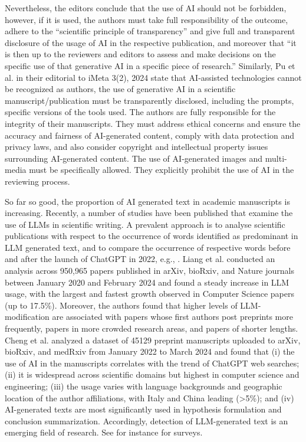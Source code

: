 Nevertheless, the editors conclude that the use of AI should not be forbidden, however, if it is used, the authors must take full responsibility of the outcome, adhere to the “scientific principle of transparency” and give full and transparent disclosure of the usage of AI in the respective publication, and moreover that “it is then up to the reviewers and editors to assess and make decisions on the specific use of that generative AI in a specific piece of research.”
Similarly, Pu et al. \cite{pu2024chatgpt} in their editorial to iMeta 3(2), 2024 state that AI‐assisted technologies cannot be recognized as authors, the use of generative AI in a scientific manuscript/publication must be transparently disclosed, including the prompts, specific versions of the tools used. The authors are fully responsible for the integrity of their manuscripts. They must address ethical concerns and ensure the accuracy and fairness of AI-generated content, comply with data protection and privacy laws, and also consider copyright and intellectual property issues surrounding AI‐generated content. The use of AI‐generated images and multi-media must be specifically allowed. They explicitly prohibit the use of AI in the reviewing process.

So far so good, the proportion of AI generated text in academic manuscripts is increasing. Recently, a number of studies have been published that examine the use of LLMs in scientific writing. A prevalent approach is to analyse scientific publications with respect to the occurrence of words identified as predominant in LLM generated text, and to compare the occurrence of respective words before and after the launch of ChatGPT in 2022, e.g.,  \cite{gray2024chatgptcontaminationestimatingprevalence, kobak2024delving}.  Liang et al. \cite{liang2024mapping} conducted an analysis across 950,965 papers published in arXiv, bioRxiv, and Nature journals between January 2020 and February 2024 and found a steady increase in LLM usage, with the largest and fastest growth observed in Computer Science papers (up to 17.5\%). Moreover, the authors found that higher levels of LLM-modification are associated with papers whose first authors post preprints more frequently, papers in more crowded research areas, and papers of shorter lengths. Cheng et al. \cite{cheng2024have} analyzed a dataset of 45129 preprint manuscripts uploaded to arXiv, bioRxiv, and medRxiv from January 2022 to March 2024 and found that (i) the use of AI in the manuscripts  correlates with the trend of ChatGPT web searches; (ii) it is widespread across scientific domains but highest in computer science and engineering; (iii) the usage varies with language backgrounds and geographic location of the author affiliations, with Italy and China leading (>5\%); and (iv) AI-generated texts are most significantly used in hypothesis formulation and conclusion summarization.
Accordingly, detection of LLM-generated text is an emerging field of research. See for instance \cite{tang2024science, wu2025survey} for surveys. 


